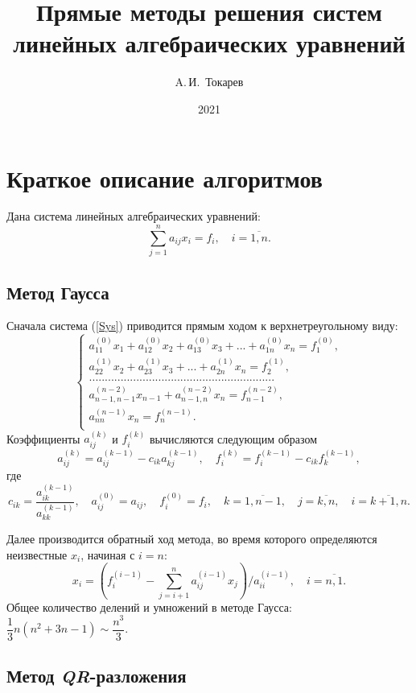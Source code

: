 \documentclass[12pt, a4paper]{article}
\title{Прямые методы решения систем линейных алгебраических уравнений}
\author{A.\,И.~Токарев}
\date{2021}
\def\hmath$#1${\texorpdfstring{{\rmfamily\textit{#1}}}{#1}}
\begin{document}
\maketitle
\tableofcontents 
\newpage

\section{Краткое описание алгоритмов}
Дана система линейных алгебраических уравнений:
\begin{equation}
\sum_{j=1}^{n} a_{ij}x_i = f_i , \quad i = \overline{1,n}.
\label{Sys}
\end{equation}

\subsection{Метод Гаусса}
Сначала система (\ref{Sys}) приводится прямым ходом к верхнетреугольному виду: 
\[\left\{
\begin{aligned}
a_{11}^{(0)}x_1 + a_{12}^{(0)}x_2 + a_{13}^{(0)}x_3 + ... + a_{1n}^{(0)}x_n = f_1^{(0)},\\
a_{22}^{(1)}x_2 + a_{23}^{(1)}x_3 + ... + a_{2n}^{(1)}x_n = f_2^{(1)},\\
...........................................................\\
a_{n-1,n-1}^{(n-2)}x_{n-1} + a_{n-1,n}^{(n-2)}x_n = f_{n-1}^{(n-2)},\\
a_{nn}^{(n-1)}x_n = f_{n}^{(n-1)}.\\
\end{aligned}
\right.
\]
Коэффициенты $a_{ij}^{(k)}$ и $f_i^{(k)}$ вычисляются следующим образом
\[
a_{ij}^{(k)} = a_{ij}^{(k-1)} - c_{ik}a_{kj}^{(k-1)}, \quad f_{i}^{(k)} = f_{i}^{(k-1)} - c_{ik}f_{k}^{(k-1)}, 
\]
где
\[
c_{ik} = \dfrac{a_{ik}^{(k-1)}}{a_{kk}^{(k-1)}}, \quad a_{ij}^{(0)}=a_{ij}, \quad f_{i}^{(0)} = f_i, \quad k = \overline{1,n-1},\quad j =\overline{k,n}, \quad i = \overline{k+1,n}.
\]

Далее производится обратный ход метода, во время которого определяются неизвестные $x_i$, начиная с $i = n$:
\[
x_i =\left(f_i^{(i-1)}-\sum_{j=i+1}^{n} a_{ij}^{(i-1)}x_j\right)/a_{ii}^{(i-1)}, \quad i = \overline{n,1}.
\]
Общее количество делений и умножений в методе Гаусса: $\dfrac{1}{3}n(n^2+3n-1) \sim \dfrac{n^3}{3}$.

\newpage

\subsection {Метод \hmath $QR$-разложения}
\end{document}
